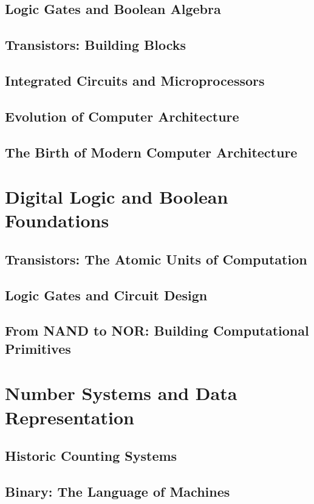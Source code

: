 \documentclass[12pt, oneside]{book}
\begin{document}
	\section{Logic Gates and Boolean Algebra}
	
	\section{Transistors: Building Blocks}
	
	\section{Integrated Circuits and Microprocessors}
	
	\section{Evolution of Computer Architecture}
	\section{The Birth of Modern Computer Architecture}
	
	\chapter{Digital Logic and Boolean Foundations}
	\section{Transistors: The Atomic Units of Computation}
	\section{Logic Gates and Circuit Design}
	\section{From NAND to NOR: Building Computational Primitives}
	
	\chapter{Number Systems and Data Representation}
	\section{Historic Counting Systems}
	\section{Binary: The Language of Machines}
\end{document}
